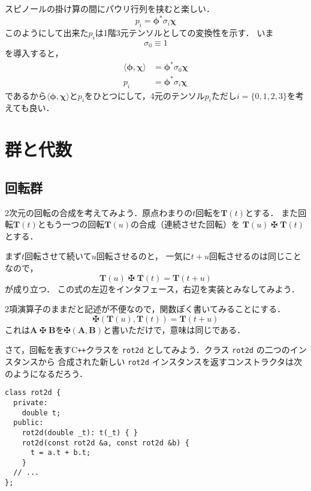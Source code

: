 \documentclass{jsbook}
\newcommand{\cxx}{\textrm{C}\texttt{++}}
\newcommand{\ccode}[1]{\texttt{#1}}
\newcommand{\bvec}[1]{\boldsymbol{#1}}
\newcommand{\bop}[1]{\boldsymbol{#1}}
\newcommand{\One}{1}%
\newcommand{\opmaltese}{\mathop{\maltese}}
\begin{document}
スピノールの掛け算の間にパウリ行列を挟むと楽しい．
\begin{equation}
p_i=\bvec{\phi}^*\sigma_i\bvec{\chi}
\end{equation}
このようにして出来た$p_i$は1階3元テンソルとしての変換性を示す．
いま
\begin{equation}
\sigma_0\equiv\One
\end{equation}
を導入すると，
\begin{align}
\langle\bvec{\phi},\bvec{\chi}\rangle&=\bvec{\phi}^*\sigma_0\bvec{\chi}\\
p_i&=\bvec{\phi}^*\sigma_i\bvec{\chi}
\end{align}
であるから$\langle\bvec{\phi},\bvec{\chi}\rangle$と$p_i$をひとつにして，4元のテンソル$p_i$ただし$i=\{0,1,2,3\}$を考えても良い．

\chapter{群と代数}

\section{回転群}

2次元の回転の合成を考えてみよう．原点わまりの$t$回転を$\bop{T}(t)$とする．
また回転$\bop{T}(t)$ともう一つの回転$\bop{T}(u)$の合成（連続させた回転）を
$\bop{T}(u)\opmaltese\bop{T}(t)$とする．

まず$t$回転させて続いて$u$回転させるのと，
一気に$t+u$回転させるのは同じことなので，
\begin{equation}
\bop{T}(u)\opmaltese\bop{T}(t)=\bop{T}(t+u)
\end{equation}
が成り立つ．
この式の左辺をインタフェース，右辺を実装とみなしてみよう．

2項演算子のままだと記述が不便なので，関数ぽく書いてみることにする．
\begin{equation}
\maltese(\bop{T}(u),\bop{T}(t))=\bop{T}(t+u)
\end{equation}
これは$\bop{A}\opmaltese\bop{B}$を$\maltese(\bop{A},\bop{B})$と書いただけで，意味は同じである．

さて，回転を表す\cxx クラスを \ccode{rot2d} としてみよう．クラス \ccode{rot2d} の二つのインスタンスから
合成された新しい \ccode{rot2d} インスタンスを返すコンストラクタは次のようになるだろう．

\begin{verbatim}
class rot2d {
  private:
    double t;
  public:
    rot2d(double _t): t(_t) { }
    rot2d(const rot2d &a, const rot2d &b) {
      t = a.t + b.t;
    }
  // ...
};
\end{verbatim}
\end{document}
